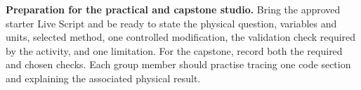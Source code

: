 \documentclass[11pt,a4paper]{article}
\begin{document}
\begin{keybox}\textbf{Preparation for the practical and capstone studio.} Bring the approved starter Live Script and be ready to state the physical question, variables and units, selected method, one controlled modification, the validation check required by the activity, and one limitation. For the capstone, record both the required and chosen checks. Each group member should practise tracing one code section and explaining the associated physical result.\end{keybox}
\end{document}
